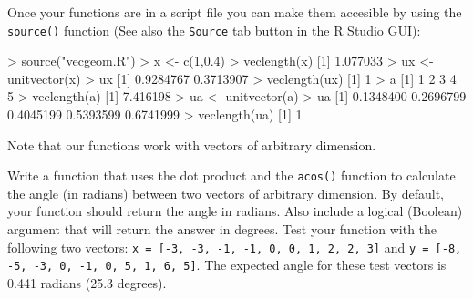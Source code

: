 Once your functions are in a script file you can make them accesible by
using the \lstinline!source()! function (See also the
\lstinline!Source! tab button in the R Studio GUI):
%
\begin{R}
> source("vecgeom.R")
> x <- c(1,0.4)
> veclength(x)
[1] 1.077033
> ux <- unitvector(x)
> ux
[1] 0.9284767 0.3713907
> veclength(ux)
[1] 1
> a
[1] 1 2 3 4 5
> veclength(a)
[1] 7.416198
> ua <- unitvector(a)
> ua
[1] 0.1348400 0.2696799 0.4045199 0.5393599 0.6741999
> veclength(ua)
[1] 1
\end{R}
Note that our functions work with vectors of arbitrary dimension.


\begin{assignment}
Write a function that uses the dot product and the \lstinline!acos()! function to calculate the angle (in radians) between two vectors of arbitrary dimension.  By default, your function should return the angle in radians. Also include a logical (Boolean) argument that will return the answer in degrees.  Test your function with the following two vectors: \lstinline!x = [-3, -3, -1, -1, 0, 0, 1, 2, 2, 3]! and
\lstinline!y = [-8, -5, -3, 0, -1, 0, 5, 1, 6, 5]!.  The expected angle for these test vectors is 0.441 radians (25.3 degrees).
\end{assignment}


